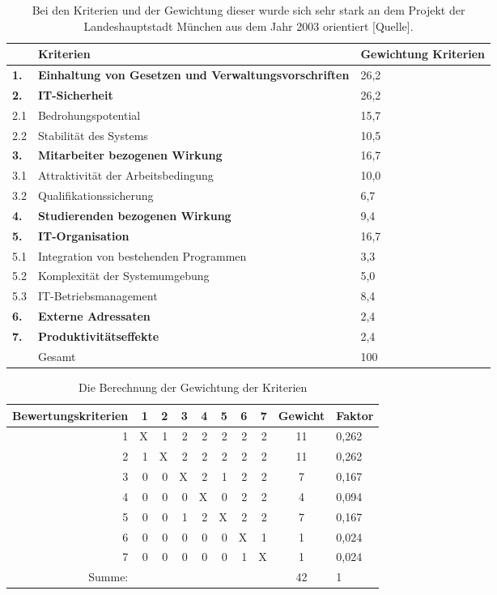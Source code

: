 \documentclass[12pt,utf8]{scrartcl}
\begin{document}
\begin{table}[h]
\begin{tabular}{|p{}|p{12cm}|p{2cm}|}
\hline
 & Kriterien & Gewichtung Kriterien\\
\hline
\textbf{1.} &  \textbf{Einhaltung von Gesetzen und Verwaltungsvorschriften}  & 26,2\\
\hline
\hline
\textbf{2.} & \textbf{IT-Sicherheit} & 26,2\\
\hline
2.1 & Bedrohungspotential & 15,7 \\
\hline
2.2 & Stabilität des Systems & 10,5 \\
\hline
\hline
\textbf{3.} & \textbf{Mitarbeiter bezogenen Wirkung} & 16,7\\
\hline
3.1 & Attraktivität der Arbeitsbedingung & 10,0 \\
\hline
3.2 & Qualifikationssicherung & 6,7 \\
\hline
\hline
\textbf{4.} & \textbf{Studierenden bezogenen Wirkung} & 9,4\\
\hline
\hline
\textbf{5.} & \textbf{IT-Organisation} & 16,7\\
\hline
5.1 & Integration von bestehenden Programmen & 3,3 \\
\hline
5.2 & Komplexität der Systemumgebung & 5,0 \\
\hline
5.3 & IT-Betriebsmanagement & 8,4 \\
\hline
\hline
\textbf{6.} & \textbf{Externe Adressaten} & 2,4\\
\hline
\hline
\textbf{7.} & \textbf{Produktivitätseffekte} & 2,4\\
\hline
\hline
\hline
 & Gesamt & 100\\
\hline
\end{tabular}
\caption*{Bei den Kriterien und der Gewichtung dieser wurde sich sehr stark an dem Projekt der Landeshauptstadt München aus dem Jahr 2003 orientiert [Quelle].}
\end{table}

\begin{table}[h!]
\centering
\begin{tabular}{|r|r|r|r|r|r|r|r|c|l|}
\hline
Bewertungskriterien & 1 & 2 & 3 & 4 & 5 & 6 & 7 & Gewicht & Faktor \\
\hline
1 & X & 1 & 2 & 2 & 2 & 2 & 2 & 11 & 0,262 \\
\hline
2 & 1 & X & 2 & 2 & 2 & 2 & 2 & 11 & 0,262 \\
\hline
3 & 0 & 0 & X & 2 & 1 & 2 & 2 & 7 & 0,167 \\
\hline
4 & 0 & 0 & 0 & X & 0 & 2 & 2 & 4 & 0,094 \\
\hline
5 & 0 & 0 & 1 & 2 & X & 2 & 2 & 7 & 0,167 \\
\hline
6 & 0 & 0 & 0 & 0 & 0 & X & 1 & 1 & 0,024 \\
\hline
7 & 0 & 0 & 0 & 0 & 0 & 1 & X & 1 & 0,024 \\
\hline
Summe: & & & & & & & & 42 & 1 \\
\hline
\end{tabular}
\caption*{Die Berechnung der Gewichtung der Kriterien}
\end{table}
\end{document}
